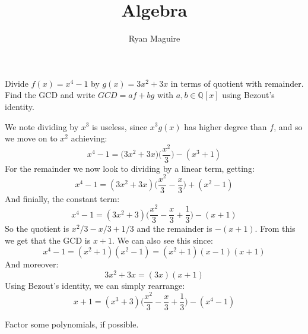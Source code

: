 \documentclass{article}                                                        %
\begin{document}
    \title{Algebra}
    \author{Ryan Maguire}
    \date{\vspace{-5ex}}
    \maketitle
    \setcounter{section}{1}
    \begin{problem}
        Divide $f(x)=x^{4}-1$ by $g(x)=3x^{2}+3x$ in terms of quotient with
        remainder. Find the GCD and write $GCD=af+bg$ with $a,b\in\mathbb{Q}[x]$
        using Bezout's identity.
    \end{problem}
    \begin{solution}
        We note dividing by $x^{3}$ is useless, since $x^{3}g(x)$ has higher
        degree than $f$, and so we move on to $x^{2}$ achieving:
        \begin{equation}
            x^{4}-1=\big(3x^{2}+3x\big)\Big(\frac{x^{2}}{3}\Big)
                -(x^{3}+1)
        \end{equation}
        For the remainder we now look to dividing by a linear term, getting:
        \begin{equation}
            x^{4}-1=(3x^{2}+3x)\Big(\frac{x^{2}}{3}-\frac{x}{3}\Big)+(x^{2}-1)
        \end{equation}
        And finially, the constant term:
        \begin{equation}
            x^{4}-1=(3x^{2}+3)\Big(\frac{x^{2}}{3}-\frac{x}{3}+\frac{1}{3}\Big)
                -(x+1)
        \end{equation}
        So the quotient is $x^{2}/3-x/3+1/3$ and the remainder is $\minus(x+1)$.
        From this we get that the GCD is $x+1$. We can also see this since:
        \begin{equation}
            x^{4}-1=(x^{2}+1)(x^{2}-1)=(x^{2}+1)(x-1)(x+1)
        \end{equation}
        And moreover:
        \begin{equation}
            3x^{2}+3x=(3x)(x+1)
        \end{equation}
        Using Bezout's identity, we can simply rearrange:
        \begin{equation}
            x+1=(x^{3}+3)\Big(\frac{x^{2}}{3}-\frac{x}{3}+\frac{1}{3}\Big)
                -(x^{4}-1)
        \end{equation}
    \end{solution}
    \begin{problem}
        Factor some polynomials, if possible.
    \end{problem}
\end{document}
